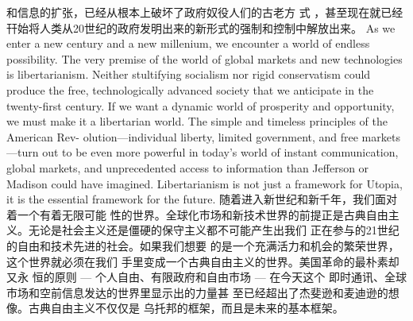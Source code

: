 \begin{paracol}{2}
和信息的扩张，已经从根本上破坏了政府奴役人们的古老方
式 ，甚至现在就已经幵始将人类从20世纪的政府发明出来的新形式的强制和控制中解放出来。
\switchcolumn*
As we enter a new century and a new millenium, we encounter a world of endless possibility. The very premise of the
world of global markets and new technologies is libertarianism.
Neither stultifying socialism nor rigid conservatism could produce the free, technologically advanced society that we anticipate in the twenty-first century. If we want a dynamic world of
prosperity and opportunity, we must make it a libertarian world. The simple and timeless principles of the American Rev-
olution---individual liberty, limited government, and free markets---turn out to be even more powerful in today's world of
instant communication, global markets, and unprecedented access to information than Jefferson or Madison could have imagined. Libertarianism is not just a framework for Utopia, it is the
essential framework for the future.
\switchcolumn
随着进入新世纪和新千年，我们面对着一个有着无限可能
性的世界。全球化市场和新技术世界的前提正是古典自由主
义。无论是社会主义还是僵硬的保守主义都不可能产生出我们
正在参与的21世纪的自由和技术先进的社会。如果我们想要
的是一个充满活力和机会的繁荣世界，这个世界就必须在我们
手里变成一个古典自由主义的世界。美国革命的最朴素却又永
恒的原则 --- 个人自由、有限政府和自由市场 --- 在今天这个
即时通讯、全球市场和空前信息发达的世界里显示出的力量甚
至已经超出了杰斐逊和麦迪逊的想像。古典自由主义不仅仅是
乌托邦的框架，而且是未来的基本框架。

\end{paracol}